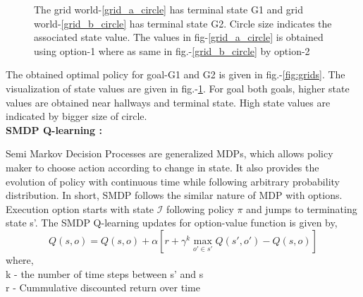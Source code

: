 \documentclass[preprint,12pt]{elsarticle}
\begin{document}
\begin{figure}[H]
	\centering  
	\caption{The grid world-\ref{grid_a_circle} has terminal state G1 and grid world-\ref{grid_b_circle} has terminal state G2. Circle size indicates the associated state value. The values in fig-\ref{grid_a_circle} is obtained using option-1 where as same in fig.-\ref{grid_b_circle} by option-2}
	\label{fig:state_val}
\end{figure}

The obtained optimal policy for goal-G1 and G2 is given in fig.-\ref{fig:grids}. The visualization of state values are given in fig.-\ref{fig:state_val}. For goal both goals, higher state values are obtained near hallways and terminal state. High state values are indicated by bigger size of circle.  \\

\textbf{SMDP Q-learning :}
\vspace{2mm}

Semi Markov Decision Processes are generalized MDPs, which allows policy maker to choose action according to change in state. It also provides the evolution of policy with continuous time while following arbitrary probability distribution. In short, SMDP follows the similar nature of MDP with options. Execution option starts with state $\mathcal{I}$ following policy $\pi$ and jumps to terminating state s'. The SMDP Q-learning updates for option-value function is given by,
\begin{equation}
	Q(s,o)  = Q(s,o) + \alpha [ r + \gamma^k \max_{o'\in s'} Q(s',o') - Q(s,o)]
\end{equation}
where, \\
k -  the number of time steps between s' and s \\
r - Cummulative discounted return over time\\
 
\end{document}
